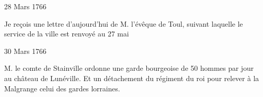                      \begin{diary}{28 Mars 1766}{}
                        
                         Je reçois une lettre d'aujourd'hui de
                           M. l'évêque de Toul, suivant
                           laquelle
                           le service de la ville est renvoyé au 27
                              mai
                        \bigskip
        
        
                     \end{diary}

                     \begin{diary}{30 Mars 1766}{}
                        
                        
                           M. le comte de Stainville ordonne
                           une
                           garde bourgeoise de 50 hommes par jour au
                           château de
                              Lunéville. Et un détachement
                           du régiment du roi pour relever à la Malgrange
                           celui des gardes
                           lorraines. \bigskip
        
        
                     \end{diary}
                     

